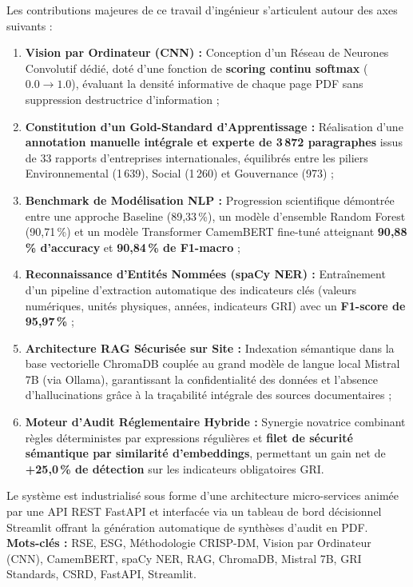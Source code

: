\documentclass[12pt,a4paper]{report}
\begin{document}
Les contributions majeures de ce travail d'ingénieur s'articulent autour des axes suivants :
\begin{enumerate}
    \item \textbf{Vision par Ordinateur (CNN) :} Conception d'un Réseau de Neurones Convolutif dédié, doté d'une fonction de \textbf{scoring continu softmax} ($0.0 \rightarrow 1.0$), évaluant la densité informative de chaque page PDF sans suppression destructrice d'information ;
    \item \textbf{Constitution d'un Gold-Standard d'Apprentissage :} Réalisation d'une \textbf{annotation manuelle intégrale et experte de 3\,872 paragraphes} issus de 33 rapports d'entreprises internationales, équilibrés entre les piliers Environnemental (1\,639), Social (1\,260) et Gouvernance (973) ;
    \item \textbf{Benchmark de Modélisation NLP :} Progression scientifique démontrée entre une approche Baseline (89,33\,\%), un modèle d'ensemble Random Forest (90,71\,\%) et un modèle Transformer CamemBERT fine-tuné atteignant \textbf{90,88\,\% d'accuracy} et \textbf{90,84\,\% de F1-macro} ;
    \item \textbf{Reconnaissance d'Entités Nommées (spaCy NER) :} Entraînement d'un pipeline d'extraction automatique des indicateurs clés (valeurs numériques, unités physiques, années, indicateurs GRI) avec un \textbf{F1-score de 95,97\,\%} ;
    \item \textbf{Architecture RAG Sécurisée sur Site :} Indexation sémantique dans la base vectorielle ChromaDB couplée au grand modèle de langue local Mistral 7B (via Ollama), garantissant la confidentialité des données et l'absence d'hallucinations grâce à la traçabilité intégrale des sources documentaires ;
    \item \textbf{Moteur d'Audit Réglementaire Hybride :} Synergie novatrice combinant règles déterministes par expressions régulières et \textbf{filet de sécurité sémantique par similarité d'embeddings}, permettant un gain net de \textbf{+25,0\,\% de détection} sur les indicateurs obligatoires GRI.
\end{enumerate}

Le système est industrialisé sous forme d'une architecture micro-services animée par une API REST FastAPI et interfacée via un tableau de bord décisionnel Streamlit offrant la génération automatique de synthèses d'audit en PDF.\\

\textbf{Mots-clés :} RSE, ESG, Méthodologie CRISP-DM, Vision par Ordinateur (CNN), CamemBERT, spaCy NER, RAG, ChromaDB, Mistral 7B, GRI Standards, CSRD, FastAPI, Streamlit.
\end{document}
